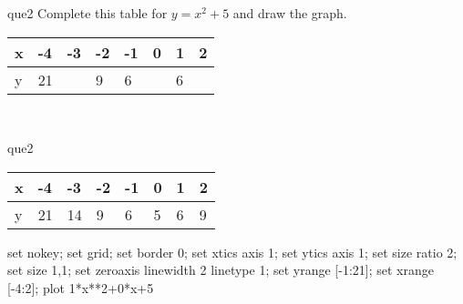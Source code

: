 \documentclass[13.5pt, varwidth=true]{beamer}
\begin{document}
\begin{frame}[shrink=19,fragile]
	\begin{beamercolorbox}[rounded=true, left, shadow=true,wd=14.8cm]{que2}
		 Complete this table for $y = x^{2} + 5$ and draw the graph. \\[0.3cm] \renewcommand{\arraystretch}{1.2}\begin{tabular}{|C|C|C|C|C|C|C|C|} \hline x & -4 & -3 & -2 & -1 & 0 & 1 & 2 \\ \hline y & 21 &  & 9 & 6 &  & 6 & \\ \hline \end{tabular}\\[0.3cm]
	\end{beamercolorbox}
\end{frame}
\begin{frame}[shrink=19,fragile]
	\begin{beamercolorbox}[rounded=true, left, shadow=true,wd=14.8cm]{que2}
		\renewcommand{\arraystretch}{1.2}\begin{tabular}{|C|C|C|C|C|C|C|C|} \hline x & -4 & -3 & -2 & -1 & 0 & 1 & 2 \\ \hline y & 21 & 14 & 9 & 6 & 5 & 6 & 9\\ \hline \end{tabular}\begin{gnuplot}[terminal=pdf] set nokey; set grid; set border 0; set xtics axis 1; set ytics axis 1; set size ratio 2; set size 1,1; set zeroaxis linewidth 2 linetype 1; set yrange [-1:21]; set xrange [-4:2]; plot 1*x**2+0*x+5 \end{gnuplot}
	\end{beamercolorbox}
\end{frame}
\end{document}
